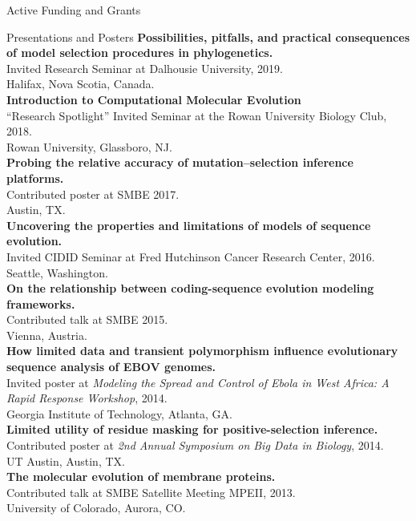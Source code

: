 \documentclass{resume} %
\begin{document}
\begin{rSection}{Active Funding and Grants}
\begin{rSection}{Presentations and Posters}
\textbf{Possibilities, pitfalls, and practical consequences of model selection procedures in phylogenetics.}
\\Invited Research Seminar at Dalhousie University, 2019.
\\ Halifax, Nova Scotia, Canada.\\

\textbf{Introduction to Computational Molecular Evolution}
\\``Research Spotlight'' Invited Seminar at the Rowan University Biology Club, 2018.
\\ Rowan University, Glassboro, NJ.\\

\textbf{Probing the relative accuracy of mutation--selection inference platforms.}
\\Contributed poster at SMBE 2017.
\\ Austin, TX.\\

\textbf{Uncovering the properties and limitations of models of sequence evolution.}
\\Invited CIDID Seminar at Fred Hutchinson Cancer Research Center, 2016.
\\ Seattle, Washington.\\

\textbf{On the relationship between coding-sequence evolution modeling frameworks.}
\\Contributed talk at SMBE 2015.
\\ Vienna, Austria.\\

\textbf{How limited data and transient polymorphism influence evolutionary sequence analysis of EBOV genomes.}
\\Invited poster at \emph{Modeling the Spread and Control of Ebola in West Africa: A Rapid Response Workshop}, 2014.
\\ Georgia Institute of Technology, Atlanta, GA.\\

\textbf{Limited utility of residue masking for positive-selection inference.}
\\Contributed poster at \emph{2nd Annual Symposium on Big Data in Biology}, 2014.
\\ UT Austin, Austin, TX.\\

\textbf{The molecular evolution of membrane proteins.}
\\Contributed talk at SMBE Satellite Meeting MPEII, 2013.
\\ University of Colorado, Aurora, CO. \\


\end{rSection}
\end{rSection}
\end{document}
